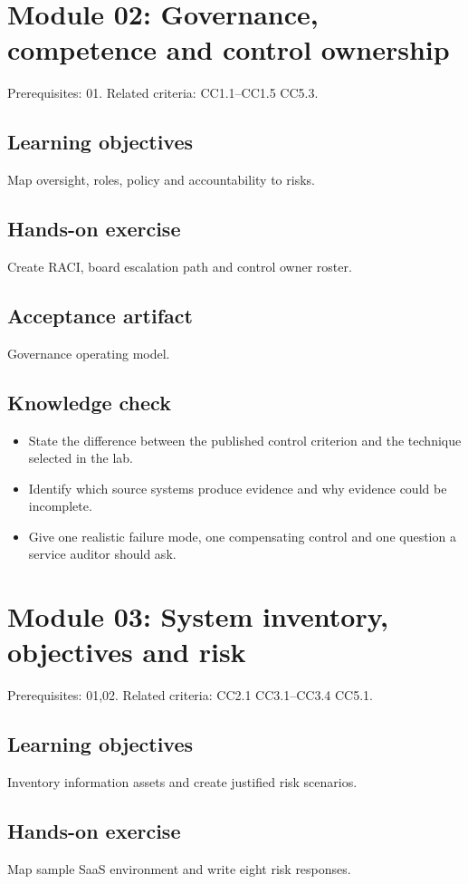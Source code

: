 \documentclass[10pt,oneside]{report}
\begin{document}
\section{Module 02: Governance, competence and control ownership}
Prerequisites: 01. Related criteria: CC1.1--CC1.5 CC5.3.

\subsection{Learning objectives}
Map oversight, roles, policy and accountability to risks.

\subsection{Hands-on exercise}
Create RACI, board escalation path and control owner roster.

\subsection{Acceptance artifact}
Governance operating model.

\subsection{Knowledge check}
\begin{itemize}
\item State the difference between the published control criterion and the technique selected in the lab.
\item Identify which source systems produce evidence and why evidence could be incomplete.
\item Give one realistic failure mode, one compensating control and one question a service auditor should ask.
\end{itemize}

\section{Module 03: System inventory, objectives and risk}
Prerequisites: 01,02. Related criteria: CC2.1 CC3.1--CC3.4 CC5.1.

\subsection{Learning objectives}
Inventory information assets and create justified risk scenarios.

\subsection{Hands-on exercise}
Map sample SaaS environment and write eight risk responses.
\end{document}
